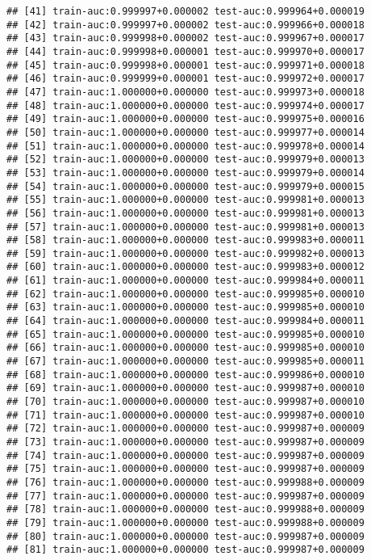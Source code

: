 \documentclass[11pt,]{article}
\begin{document}
\begin{verbatim}
## [41] train-auc:0.999997+0.000002 test-auc:0.999964+0.000019 
## [42] train-auc:0.999997+0.000002 test-auc:0.999966+0.000018 
## [43] train-auc:0.999998+0.000002 test-auc:0.999967+0.000017 
## [44] train-auc:0.999998+0.000001 test-auc:0.999970+0.000017 
## [45] train-auc:0.999998+0.000001 test-auc:0.999971+0.000018 
## [46] train-auc:0.999999+0.000001 test-auc:0.999972+0.000017 
## [47] train-auc:1.000000+0.000000 test-auc:0.999973+0.000018 
## [48] train-auc:1.000000+0.000000 test-auc:0.999974+0.000017 
## [49] train-auc:1.000000+0.000000 test-auc:0.999975+0.000016 
## [50] train-auc:1.000000+0.000000 test-auc:0.999977+0.000014 
## [51] train-auc:1.000000+0.000000 test-auc:0.999978+0.000014 
## [52] train-auc:1.000000+0.000000 test-auc:0.999979+0.000013 
## [53] train-auc:1.000000+0.000000 test-auc:0.999979+0.000014 
## [54] train-auc:1.000000+0.000000 test-auc:0.999979+0.000015 
## [55] train-auc:1.000000+0.000000 test-auc:0.999981+0.000013 
## [56] train-auc:1.000000+0.000000 test-auc:0.999981+0.000013 
## [57] train-auc:1.000000+0.000000 test-auc:0.999981+0.000013 
## [58] train-auc:1.000000+0.000000 test-auc:0.999983+0.000011 
## [59] train-auc:1.000000+0.000000 test-auc:0.999982+0.000013 
## [60] train-auc:1.000000+0.000000 test-auc:0.999983+0.000012 
## [61] train-auc:1.000000+0.000000 test-auc:0.999984+0.000011 
## [62] train-auc:1.000000+0.000000 test-auc:0.999985+0.000010 
## [63] train-auc:1.000000+0.000000 test-auc:0.999985+0.000010 
## [64] train-auc:1.000000+0.000000 test-auc:0.999984+0.000011 
## [65] train-auc:1.000000+0.000000 test-auc:0.999985+0.000010 
## [66] train-auc:1.000000+0.000000 test-auc:0.999985+0.000010 
## [67] train-auc:1.000000+0.000000 test-auc:0.999985+0.000011 
## [68] train-auc:1.000000+0.000000 test-auc:0.999986+0.000010 
## [69] train-auc:1.000000+0.000000 test-auc:0.999987+0.000010 
## [70] train-auc:1.000000+0.000000 test-auc:0.999987+0.000010 
## [71] train-auc:1.000000+0.000000 test-auc:0.999987+0.000010 
## [72] train-auc:1.000000+0.000000 test-auc:0.999987+0.000009 
## [73] train-auc:1.000000+0.000000 test-auc:0.999987+0.000009 
## [74] train-auc:1.000000+0.000000 test-auc:0.999987+0.000009 
## [75] train-auc:1.000000+0.000000 test-auc:0.999987+0.000009 
## [76] train-auc:1.000000+0.000000 test-auc:0.999988+0.000009 
## [77] train-auc:1.000000+0.000000 test-auc:0.999987+0.000009 
## [78] train-auc:1.000000+0.000000 test-auc:0.999988+0.000009 
## [79] train-auc:1.000000+0.000000 test-auc:0.999988+0.000009 
## [80] train-auc:1.000000+0.000000 test-auc:0.999987+0.000009 
## [81] train-auc:1.000000+0.000000 test-auc:0.999987+0.000009 

\end{verbatim}
\end{document}
